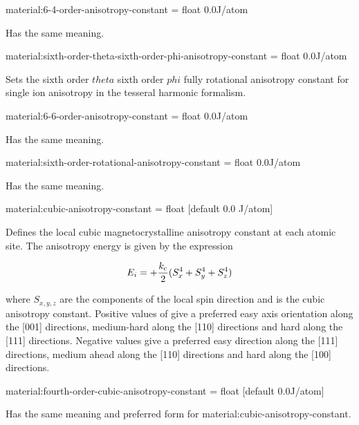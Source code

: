 {\zicf material:6-4-order-anisotropy-constant = float 0.0\newline J/atom} Has the same meaning.

{\zicf material:sixth-order-theta-sixth-order-phi-anisotropy-constant = float 0.0\newline J/atom} Sets the sixth order $theta$ sixth order $phi$ fully rotational anisotropy constant for single ion anisotropy in the tesseral harmonic formalism.

{\zicf material:6-6-order-anisotropy-constant = float 0.0\newline J/atom} Has the same meaning.

{\zicf material:sixth-order-rotational-anisotropy-constant = float 0.0\newline J/atom} Has the same meaning.

{\zicf material:cubic-anisotropy-constant = float [default 0.0 J/atom]}
Defines the local cubic magnetocrystalline anisotropy constant at each atomic site. The anisotropy energy is given by the expression

\begin{equation*}
E_i = +\frac{k_{\mathrm{c}}}{2} (S_x^4 + S_y^4 + S_z^4)
\end{equation*}

\noindent where $S_{x,y,z}$ are the components of the local spin direction and \kc is the cubic anisotropy constant. Positive values of \kc give a preferred easy axis orientation along the [001] directions, medium-hard along the [110] directions and hard along the [111] directions. Negative values give a preferred easy direction along the [111] directions, medium ahead along the [110] directions and hard along the [100] directions.

{\zicf material:fourth-order-cubic-anisotropy-constant = float [default 0.0\newline J/atom]} Has the same meaning and preferred form for material:cubic-anisotropy-constant.


